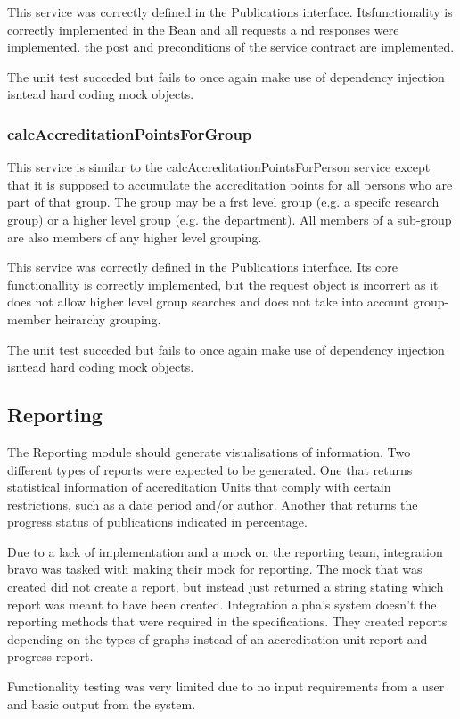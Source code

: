 \documentclass[a4paper,10pt]{article}
\begin{document}
This service was correctly defined in the Publications interface. Itsfunctionality is correctly implemented in the Bean and all requests a nd responses were implemented. the post and preconditions of the service contract are implemented.

The unit test succeded but fails to once again make use of dependency injection isntead hard coding mock objects.


\subsubsection{calcAccreditationPointsForGroup}
This service is similar to the calcAccreditationPointsForPerson service except that it is supposed to  accumulate
the accreditation points for all persons who are part of that group. The group may be a frst level
group (e.g. a specifc research group) or a higher level group (e.g. the department). All members
of a sub-group are also members of any higher level grouping.

This service was correctly defined in the Publications interface. Its core functionallity is correctly implemented, but the request object is incorrert as it does not allow higher level group searches and does not take into account group-member heirarchy grouping.

The unit test succeded but fails to once again make use of dependency injection isntead hard coding mock objects.
\subsection{Reporting}
The Reporting module should generate visualisations of information. Two different types of reports were expected to be generated. One that returns statistical information of accreditation Units that comply with certain restrictions, such as a date period and/or author. Another that returns the progress status of publications indicated in percentage.

Due to a lack of implementation and a mock on the reporting team, integration bravo was tasked with making their mock for reporting. The mock that was created did not create a report, but instead just returned a string stating which report was meant to have been created. Integration alpha's system doesn't the reporting methods that were required in the specifications. They created reports depending on the types of graphs instead of an accreditation unit report and progress report. 

Functionality testing was very limited due to no input requirements from a user and basic output from the system.
\end{document}
